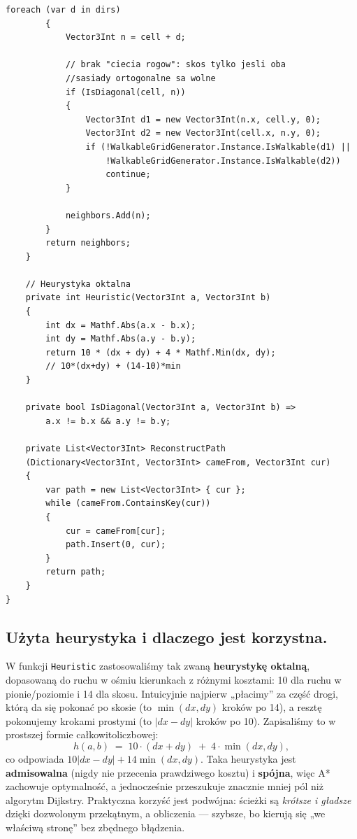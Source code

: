\documentclass[a4paper,12pt]{book} %
\begin{document}
\begin{lstlisting}[language=CSharp, caption={Algorytm A* z ruchem po przekatnej i kontrola rogow}, label={lst:astar_easy}]
        foreach (var d in dirs)
        {
            Vector3Int n = cell + d;

            // brak "ciecia rogow": skos tylko jesli oba 
            //sasiady ortogonalne sa wolne
            if (IsDiagonal(cell, n))
            {
                Vector3Int d1 = new Vector3Int(n.x, cell.y, 0);
                Vector3Int d2 = new Vector3Int(cell.x, n.y, 0);
                if (!WalkableGridGenerator.Instance.IsWalkable(d1) ||
                    !WalkableGridGenerator.Instance.IsWalkable(d2))
                    continue;
            }

            neighbors.Add(n);
        }
        return neighbors;
    }

    // Heurystyka oktalna
    private int Heuristic(Vector3Int a, Vector3Int b)
    {
        int dx = Mathf.Abs(a.x - b.x);
        int dy = Mathf.Abs(a.y - b.y);
        return 10 * (dx + dy) + 4 * Mathf.Min(dx, dy); 
        // 10*(dx+dy) + (14-10)*min
    }

    private bool IsDiagonal(Vector3Int a, Vector3Int b) => 
        a.x != b.x && a.y != b.y;

    private List<Vector3Int> ReconstructPath
    (Dictionary<Vector3Int, Vector3Int> cameFrom, Vector3Int cur)
    {
        var path = new List<Vector3Int> { cur };
        while (cameFrom.ContainsKey(cur))
        {
            cur = cameFrom[cur];
            path.Insert(0, cur);
        }
        return path;
    }
}
\end{lstlisting}

\subsection*{Użyta heurystyka i dlaczego jest korzystna.}  
W funkcji \texttt{Heuristic} zastosowaliśmy tak zwaną \textbf{heurystykę oktalną}, dopasowaną do ruchu w ośmiu kierunkach z różnymi kosztami: 10 dla ruchu w pionie/poziomie i 14 dla skosu. Intuicyjnie najpierw „płacimy” za część drogi, którą da się pokonać po skosie (to \(\min(dx,dy)\) kroków po 14), a resztę pokonujemy krokami prostymi (to \(|dx-dy|\) kroków po 10). Zapisaliśmy to w prostszej formie całkowitoliczbowej:  
\[
h(a,b) \;=\; 10\cdot(dx+dy)\;+\;4\cdot\min(dx,dy),
\]
co odpowiada \(10|dx-dy| + 14\min(dx,dy)\). Taka heurystyka jest \textbf{admisowalna} (nigdy nie przecenia prawdziwego kosztu) i \textbf{spójna}, więc A* zachowuje optymalność, a jednocześnie przeszukuje znacznie mniej pól niż algorytm Dijkstry. Praktyczna korzyść jest podwójna: ścieżki są \emph{krótsze i gładsze} dzięki dozwolonym przekątnym, a obliczenia — szybsze, bo kierują się „we właściwą stronę” bez zbędnego błądzenia.
\end{document}

